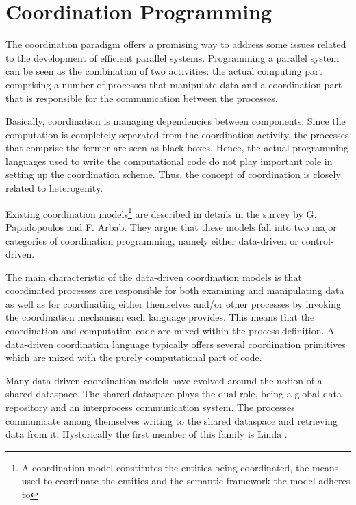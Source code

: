     \section{Coordination Programming}
The coordination paradigm offers a promising way to address some issues related to the development of efficient parallel systems. Programming a parallel system can be seen as the combination of two activities: the actual computing part comprising a number of processes that manipulate data and a coordination part that is responsible for the communication between the processes.

Basically, coordination is managing dependencies between components. Since the computation is completely separated from the coordination activity, the processes that comprise the former are seen as black boxes. Hence, the actual programming languages used to write the computational code do not play important role in setting up the coordination scheme. Thus, the concept of coordination is closely related to heterogenity.

Existing coordination models\footnote{A coordination model constitutes the entities being coordinated, the means used to ccordinate the entities and the semantic framework the model adheres to} are described in details in the survey \cite{papadopoulos} by G. Papadopoulos and F. Arbab. They argue that these models fall into two major categories of coordination programming, namely either data-driven or control-driven.

The main characteristic of the data-driven coordination models is that coordinated processes are responsible for both examining and manipulating data as well as for coordinating either themselves and/or other processes by invoking the coordination mechanism each language provides. This means that the coordination and computation code are mixed within the process definition. A data-driven coordination language typically offers several coordination primitives which are mixed with the purely computational part of code.

Many data-driven coordination models have evolved around the notion of a shared dataspace. The shared dataspace plays the dual role, being a global data repository and an interprocess communication system. The processes communicate among themselves writing to the shared dataspace and retrieving data from it. Hystorically the first member of this family is Linda \cite{linda}.

